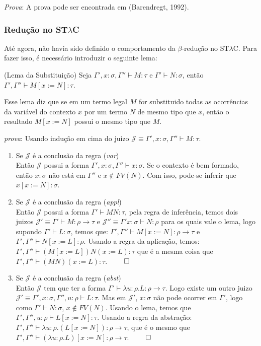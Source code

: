 \documentclass[../main.tex]{subfiles}
\begin{document}
\emph{Prova}: A prova pode ser encontrada em (Barendregt, 1992).

\subsubsection[Redução no STLC]{Redução no ST$\lambda$C}

Até agora, não havia sido definido o comportamento da $\beta$-redução no ST$\lambda$C. Para fazer isso, é necessário introduzir o seguinte lema:

\begin{lemma}(Lema da Substituição)
    Seja $\Gamma', x : \sigma, \Gamma'' \vdash M : \tau$ e $\Gamma' \vdash N : \sigma$, então $\Gamma', \Gamma'' \vdash M [x := N] : \tau$.
\end{lemma}

Esse lema diz que se em um termo legal $M$ for substituido todas as ocorrências da variável do contexto $x$ por um termo $N$ de mesmo tipo que $x$, então o resultado $M [x := N]$ possui o mesmo tipo que $M$.

\emph{prova}: Usando indução em cima do juizo $\mathcal{J} \equiv \Gamma', x : \sigma, \Gamma'' \vdash M : \tau$. 

\begin{enumerate}
    \item Se $\mathcal{J}$ é a conclusão da regra (\emph{var}) \\
    Então $\mathcal{J}$ possui a forma $\Gamma', x : \sigma, \Gamma'' \vdash x : \sigma$. Se o contexto é bem formado, então $x : \sigma$ não está em $\Gamma''$ e $x \not\in FV(N)$. Com isso, pode-se inferir que $x [x:= N] : \sigma$.
    \item Se $\mathcal{J}$ é a conclusão da regra (\emph{appl}) \\
    Então $\mathcal{J}$ possui a forma $\Gamma' \vdash MN : \tau$, pela regra de inferência, temos dois juizos $\mathcal{J}' \equiv \Gamma' \vdash M : \rho \to \tau$ e $\mathcal{J}'' \equiv \Gamma' x : \sigma \vdash N :\rho$ para os quais vale o lema, logo supondo $\Gamma' \vdash L : \sigma$, temos que: $\Gamma', \Gamma'' \vdash M [x := N] : \rho \to \tau$ e $\Gamma', \Gamma'' \vdash N [x := L] :\rho$. Usando a regra da aplicação, temos: $\Gamma', \Gamma'' \vdash (M [x := L])N(x := L) : \tau$ que é a mesma coisa que $\Gamma', \Gamma'' \vdash (MN)(x := L) : \tau$. $\qed$
    \item Se $\mathcal{J}$ é a conclusão da regra (\emph{abst}) \\
    Então $\mathcal{J}$ tem que ter a forma $\Gamma' \vdash \lambda u : \rho . L : \rho \to \tau$. Logo existe um outro juizo $\mathcal{J}' \equiv \Gamma', x : \sigma, \Gamma'', u : \rho \vdash L : \tau$. Mas em $\mathcal{J}'$, $x : \sigma$ não pode ocorrer em $\Gamma'$, logo como $\Gamma' \vdash N : \sigma$, $x \not\in FV(N)$. Usando o lema, temos que $\Gamma', \Gamma'', u : \rho \vdash L [x := N] : \tau$. Usando a regra da abstração: $\Gamma', \Gamma'' \vdash \lambda u : \rho . (L [x := N]) : \rho \to \tau$, que é o mesmo que $\Gamma', \Gamma'' \vdash (\lambda u : \rho . L) [x := N] : \rho \to \tau$. $\qed$
\end{enumerate}
\end{document}
